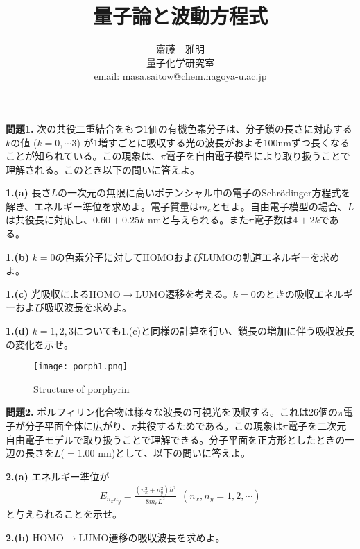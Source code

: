 \documentclass[12pt,pra,aps]{revtex4}
\begin{document}
\title{量子論と波動方程式}
\author{齋藤　雅明 \\ 量子化学研究室 \\ email: masa.saitow@chem.nagoya-u.ac.jp}

\maketitle

\noindent
{\bf 問題1.} 次の共役二重結合をもつ1価の有機色素分子は、分子鎖の長さに対応する$k$の値 ($k=0,\cdots 3$) が1増すごとに吸収する光の波長がおよそ100nmずつ長くなることが知られている。この現象は、$\pi$電子を自由電子模型により取り扱うことで理解される。このとき以下の問いに答えよ。
    
%

\noindent
{\bf 1.(a)} 長さ$L$の一次元の無限に高いポテンシャル中の電子のSchr\"odinger方程式を解き、エネルギー準位を求めよ。電子質量は$m_e$とせよ。自由電子模型の場合、$L$は共役長に対応し、$0.60+0.25k$ nmと与えられる。また$\pi$電子数は$4+2k$である。

\noindent
{\bf 1.(b)} $k=0$の色素分子に対してHOMOおよびLUMOの軌道エネルギーを求めよ。

\noindent
{\bf 1.(c)} 光吸収によるHOMO$\rightarrow$LUMO遷移を考える。$k=0$のときの吸収エネルギーおよび吸収波長を求めよ。

\noindent
{\bf 1.(d)} $k=1,2,3$についても1.(c)と同様の計算を行い、鎖長の増加に伴う吸収波長の変化を示せ。

\begin{wrapfigure}{r}[10pt]{0.3\textwidth}
  \centering
  \texttt{[image: porph1.png]}
  \caption{Structure of porphyrin}
\end{wrapfigure}

\noindent
{\bf 問題2.} ポルフィリン化合物は様々な波長の可視光を吸収する。これは26個の$\pi$電子が分子平面全体に広がり、$\pi$共役するためである。この現象は$\pi$電子を二次元自由電子モデルで取り扱うことで理解できる。分子平面を正方形としたときの一辺の長さを$L$($=1.00$ nm)として、以下の問いに答えよ。

\noindent
{\bf 2.(a)} エネルギー準位が
\begin{align}
  E_{n_x n_y} = \frac{(n_x^2+n_y^2)h^2}{8m_eL^2}\ \ (n_x,n_y=1,2,\cdots)
\end{align}
と与えられることを示せ。

\noindent
{\bf 2.(b)} HOMO$\rightarrow$LUMO遷移の吸収波長を求めよ。
\end{document}
